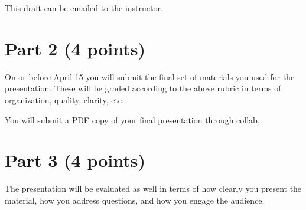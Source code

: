 \documentclass[12pt,letterpaper]{article}
\begin{document}
This draft can be emailed to the instructor.

\section*{Part 2 (4 points)}
On or before April 15 you will submit the final set of materials you used
for the presentation.  These will be graded according to the above rubric 
in terms of organization, quality, clarity, etc.  

You will submit a PDF copy of your final presentation through collab.

\section*{Part 3 (4 points)}
The presentation will be evaluated as well in terms of how clearly
you present the material, how you address questions, and how you
engage the audience.
\end{document}
